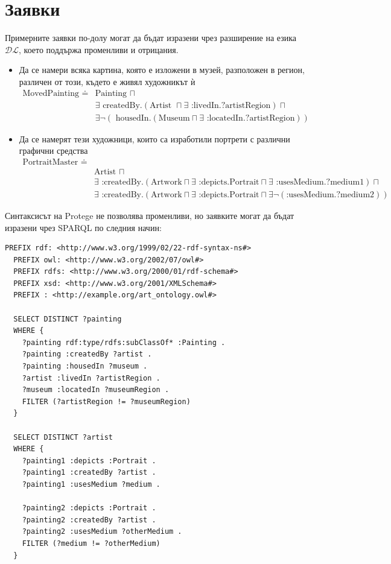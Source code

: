 \documentclass[a4paper, 11pt]{article}
\begin{document}
\section*{Заявки}
Примерните заявки по-долу могат да бъдат изразени чрез разширение на езика $\mathcal{DL}$, което поддържа променливи и отрицания\cite{halReasoningDescription}.
\begin{itemize}
  \item Да се намери всяка картина, която е изложени в музей, разположен  в регион, различен от този, където е живял художникът ѝ
    \begin{align*}
      \text{MovedPainting } \doteq
      &\text{Painting } \sqcap\\
      &\exists \text{ createdBy}.(\text{Artist }\sqcap \exists \text{ :livedIn}.\text{?artistRegion}) \sqcap\\
      &\exists \neg(\text{ housedIn}.(\text{Museum} \sqcap \exists \text{ :locatedIn}.\text{?artistRegion}))
    \end{align*}
  \item Да се намерят тези художници, които са изработили портрети с различни графични средства
    \begin{align*}
      \text{PortraitMaster } \doteq\\
      &\text{Artist } \sqcap \\
      &\exists \text{ :createdBy}.(\text{Artwork} \sqcap \exists \text{ :depicts}.\text{Portrait} \sqcap \exists \text{ :usesMedium}.\text{?medium1}) \sqcap \\
      &\exists \text{ :createdBy}.(\text{Artwork} \sqcap \exists \text{ :depicts}.\text{Portrait} \sqcap \exists\neg (\text{:usesMedium}.\text{?medium2}))
    \end{align*}
\end{itemize}
Синтаксисът на Protege не позволява променливи, но заявките могат да бъдат изразени чрез SPARQL по следния начин:
\begin{lstlisting}[language=SPARQL]
  PREFIX rdf: <http://www.w3.org/1999/02/22-rdf-syntax-ns#>
  PREFIX owl: <http://www.w3.org/2002/07/owl#>
  PREFIX rdfs: <http://www.w3.org/2000/01/rdf-schema#>
  PREFIX xsd: <http://www.w3.org/2001/XMLSchema#>
  PREFIX : <http://example.org/art_ontology.owl#>

  SELECT DISTINCT ?painting
  WHERE {
    ?painting rdf:type/rdfs:subClassOf* :Painting .
    ?painting :createdBy ?artist .
    ?painting :housedIn ?museum .
    ?artist :livedIn ?artistRegion .
    ?museum :locatedIn ?museumRegion .
    FILTER (?artistRegion != ?museumRegion)
  }

  SELECT DISTINCT ?artist
  WHERE {
    ?painting1 :depicts :Portrait .
    ?painting1 :createdBy ?artist .
    ?painting1 :usesMedium ?medium .

    ?painting2 :depicts :Portrait .
    ?painting2 :createdBy ?artist .
    ?painting2 :usesMedium ?otherMedium .
    FILTER (?medium != ?otherMedium)
  }
\end{lstlisting}
\end{document}
